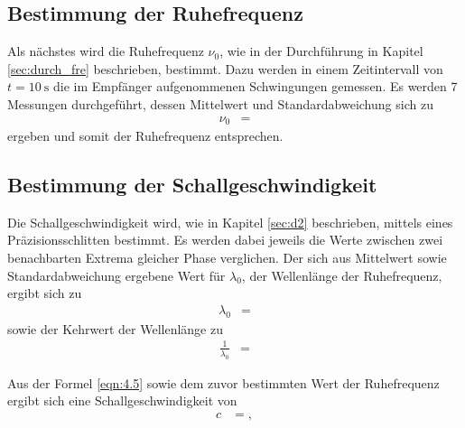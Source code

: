\subsection{Bestimmung der Ruhefrequenz}
Als nächstes wird die Ruhefrequenz $\nu_0$, wie in der Durchführung in Kapitel \ref{sec:durch_fre} beschrieben, bestimmt.
Dazu werden in einem Zeitintervall von $t = \SI{10}{\second}$ die im Empfänger aufgenommenen Schwingungen gemessen.
Es werden 7 Messungen durchgeführt, dessen Mittelwert und Standardabweichung sich zu
\begin{align*}
  \nu_0 &= 
\end{align*}
ergeben und somit der Ruhefrequenz entsprechen.


\subsection{Bestimmung der Schallgeschwindigkeit}
Die Schallgeschwindigkeit wird, wie in Kapitel \ref{sec:d2} beschrieben, mittels eines Präzisionsschlitten bestimmt.
Es werden dabei jeweils die Werte zwischen zwei benachbarten Extrema gleicher Phase verglichen.
Der sich aus Mittelwert sowie Standardabweichung ergebene Wert für $\lambda_0$, der Wellenlänge der Ruhefrequenz, ergibt sich zu
\begin{align*}
  \lambda_0 &= 
\end{align*}
sowie der Kehrwert der Wellenlänge zu
\begin{align*}
  \frac{1}{\lambda_0} &= 
\end{align*}

Aus der Formel \ref{eqn:4.5} sowie dem zuvor bestimmten Wert der Ruhefrequenz ergibt sich eine Schallgeschwindigkeit von
\begin{align*}
  c &= ,
\end{align*}






%
%    
%
